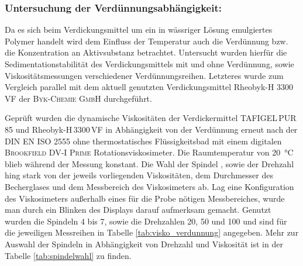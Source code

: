 \subsubsection{Untersuchung der Verdünnungsabhängigkeit:} Da es sich beim Verdickungsmittel um ein in wässriger Lösung emulgiertes Polymer handelt wird dem Einfluss der Temperatur auch die Verdünnung bzw. die Konzentration an Aktivsubstanz betrachtet. 
Untersucht wurden hierfür die Sedimentationstabilität des Verdickungsmittels mit und ohne Verdünnung, sowie Viskositätsmessungen verschiedener Verdünnungsreihen. Letzteres wurde zum Vergleich parallel mit dem aktuell genutzten Verdickungsmittel Rheobyk-H 3300 VF der \textsc{Byk-Chemie GmbH} durchgeführt.

Geprüft wurden die dynamische Viskositäten der Verdickermittel TAFIGEL\,PUR\,85 und Rheobyk-H\,3300\,VF in Abhängigkeit von der Verdünnung erneut nach der DIN EN ISO 2555 ohne thermostatisches Flüssigkeitsbad mit einem digitalen \textsc{Brookfield DV-I Prime} Rotationsviskosimeter. Die Raumtemperatur von \SI{20}{\celsius} blieb während der Messung konstant. Die Wahl der Spindel , sowie der Drehzahl hing stark von der jeweils vorliegenden Viskositäten, dem Durchmesser des Becherglases und dem Messbereich des Viskosimeters ab. Lag eine Konfiguration des Viskosimeters außerhalb eines für die Probe nötigen Messbereiches, wurde man durch ein Blinken des Displays darauf aufmerksam gemacht. Genutzt wurden die Spindeln 4 bis 7, sowie die Drehzahlen 20, 50 und \SI{100}{\rpm} und sind für die jeweiligen Messreihen in Tabelle \ref{tab:visko_verdunnung} angegeben. Mehr zur Auswahl der Spindeln in Abhängigkeit von Drehzahl und Viskosität ist in der Tabelle \ref{tab:spindelwahl} zu finden.

\begin{table}[h!]
	\renewcommand*{\arraystretch}{1.2}
	\centering
	\caption{Viskositätsbereiche der verschiedenen Spindeln in Abhängigkeit von der Drehzahl, erstellt nach \cite{brookfield_31.01.2022}}
	\label{tab:spindelwahl}
\end{table}%
\FloatBarrier

